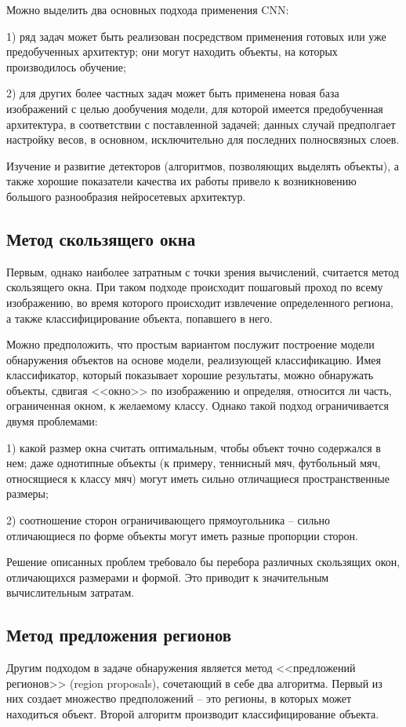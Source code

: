 \documentclass[14pt,a4paper]{extarticle}
\begin{document}
Можно выделить два основных подхода применения CNN:

1) ряд задач может быть реализован посредством применения готовых или уже предобученных архитектур; они могут находить объекты, на которых производилось обучение;

2) для других более частных задач может быть применена новая база изображений с целью дообучения модели, для которой имеется предобученная архитектура, в соответствии с поставленной задачей; данных случай предполгает настройку весов, в основном, исключительно для последних полносвязных слоев. 

Изучение и развитие детекторов (алгоритмов, позволяющих выделять объекты), а также хорошие показатели качества их работы привело к возникновению большого разнообразия нейросетевых архитектур. 

\subsection{Метод скользящего окна}
Первым, однако наиболее затратным с точки зрения вычислений, считается метод скользящего окна. При таком подходе происходит пошаговый проход по всему изображению, во время которого происходит извлечение определенного региона, а также классифицирование объекта, попавшего в него. 

Можно предположить, что простым вариантом послужит построение модели обнаружения объектов на основе модели, реализующей классификацию. Имея классификатор, который показывает хорошие результаты, можно обнаружать объекты, сдвигая <<окно>> по изображению и определяя, относится ли часть, ограниченная окном, к желаемому классу. Однако такой подход  ограничивается двумя проблемами:

1) какой размер окна считать оптимальным, чтобы объект точно содержался в нем; даже однотипные объекты (к примеру, теннисный мяч, футбольный мяч, относящиеся к классу мяч) могут иметь сильно отличащиеся пространственные размеры;

2) соотношение сторон ограничивающего прямоугольника -- сильно отличающиеся по форме объекты могут иметь разные пропорции сторон.

Решение описанных проблем требовало бы перебора различных скользящих окон, отличающихся размерами и формой. Это приводит к значительным вычислительным затратам.
 
\subsection{Метод предложения регионов}
Другим подходом в задаче обнаружения является метод <<предложений регионов>> (region proposals), сочетающий в себе два алгоритма. Первый из них создает множество предположений -- это регионы, в которых может находиться объект. Второй алгоритм производит классифицирование объекта.  
\end{document}
